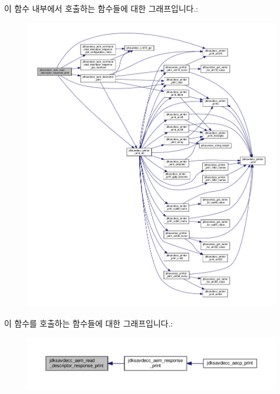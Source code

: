 이 함수 내부에서 호출하는 함수들에 대한 그래프입니다.\+:
\nopagebreak
\begin{figure}[H]
\begin{center}
\leavevmode
\includegraphics[width=350pt]{group__aem__print_gaa565b25028b932889c102445b2ae7c52_cgraph}
\end{center}
\end{figure}




이 함수를 호출하는 함수들에 대한 그래프입니다.\+:
\nopagebreak
\begin{figure}[H]
\begin{center}
\leavevmode
\includegraphics[width=350pt]{group__aem__print_gaa565b25028b932889c102445b2ae7c52_icgraph}
\end{center}
\end{figure}


